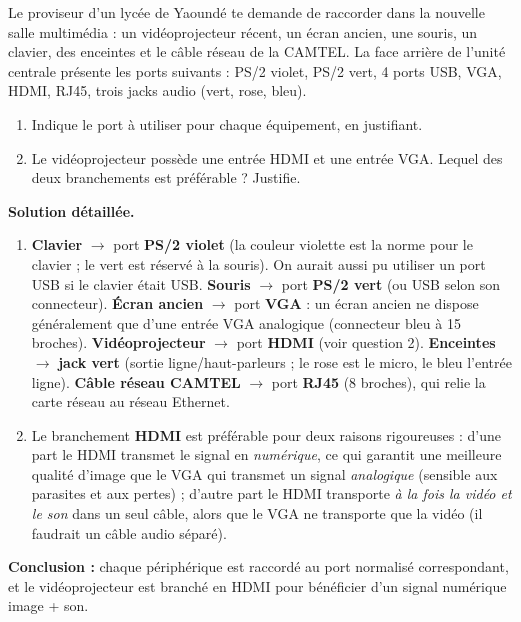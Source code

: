 \documentclass[11pt]{article}
\begin{document}
\begin{exoresolu}
Le proviseur d'un lycée de Yaoundé te demande de raccorder dans la nouvelle salle multimédia : un vidéoprojecteur récent, un écran ancien, une souris, un clavier, des enceintes et le câble réseau de la CAMTEL. La face arrière de l'unité centrale présente les ports suivants : PS/2 violet, PS/2 vert, 4 ports USB, VGA, HDMI, RJ45, trois jacks audio (vert, rose, bleu).
\begin{enumerate}
\item Indique le port à utiliser pour chaque équipement, en justifiant.
\item Le vidéoprojecteur possède une entrée HDMI et une entrée VGA. Lequel des deux branchements est préférable ? Justifie.
\end{enumerate}
\tcblower
\textbf{Solution détaillée.}
\begin{enumerate}
\item \textbf{Clavier} $\rightarrow$ port \textbf{PS/2 violet} (la couleur violette est la norme pour le clavier ; le vert est réservé à la souris). On aurait aussi pu utiliser un port USB si le clavier était USB.
\textbf{Souris} $\rightarrow$ port \textbf{PS/2 vert} (ou USB selon son connecteur).
\textbf{Écran ancien} $\rightarrow$ port \textbf{VGA} : un écran ancien ne dispose généralement que d'une entrée VGA analogique (connecteur bleu à 15 broches).
\textbf{Vidéoprojecteur} $\rightarrow$ port \textbf{HDMI} (voir question 2).
\textbf{Enceintes} $\rightarrow$ \textbf{jack vert} (sortie ligne/haut-parleurs ; le rose est le micro, le bleu l'entrée ligne).
\textbf{Câble réseau CAMTEL} $\rightarrow$ port \textbf{RJ45} (8 broches), qui relie la carte réseau au réseau Ethernet.
\item Le branchement \textbf{HDMI} est préférable pour deux raisons rigoureuses : d'une part le HDMI transmet le signal en \emph{numérique}, ce qui garantit une meilleure qualité d'image que le VGA qui transmet un signal \emph{analogique} (sensible aux parasites et aux pertes) ; d'autre part le HDMI transporte \emph{à la fois la vidéo et le son} dans un seul câble, alors que le VGA ne transporte que la vidéo (il faudrait un câble audio séparé).
\end{enumerate}
\textbf{Conclusion :} chaque périphérique est raccordé au port normalisé correspondant, et le vidéoprojecteur est branché en HDMI pour bénéficier d'un signal numérique image + son.
\end{exoresolu}
\end{document}

